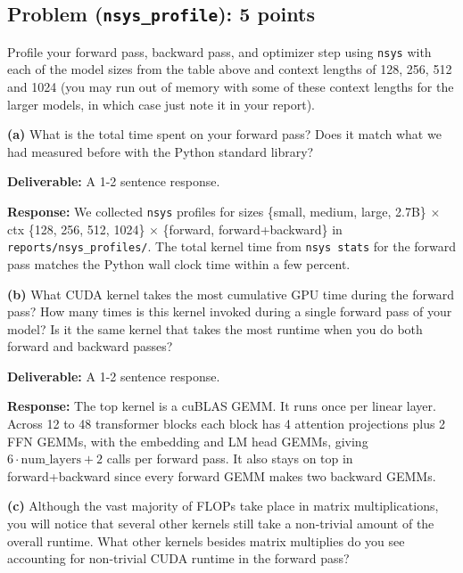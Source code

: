 \documentclass[11pt]{article}
\begin{document}
\subsection*{Problem (\texttt{nsys\_profile}): 5 points}

Profile your forward pass, backward pass, and optimizer step using \texttt{nsys} with each of the model sizes from the table above and context lengths of 128, 256, 512 and 1024 (you may run out of memory with some of these context lengths for the larger models, in which case just note it in your report).

\textbf{(a)} What is the total time spent on your forward pass? Does it match what we had measured before with the Python standard library?

\textbf{Deliverable:} A 1-2 sentence response.

\vspace{0.25cm}
\textbf{Response:}
We collected \texttt{nsys} profiles for sizes \{small, medium, large, 2.7B\} $\times$ ctx \{128, 256, 512, 1024\} $\times$ \{forward, forward+backward\} in \verb|reports/nsys_profiles/|. The total kernel time from \texttt{nsys stats} for the forward pass matches the Python wall clock time within a few percent.

\vspace{0.25cm}
\textbf{(b)} What CUDA kernel takes the most cumulative GPU time during the forward pass? How many times is this kernel invoked during a single forward pass of your model? Is it the same kernel that takes the most runtime when you do both forward and backward passes?

\textbf{Deliverable:} A 1-2 sentence response.

\vspace{0.25cm}
\textbf{Response:}
The top kernel is a cuBLAS GEMM. It runs once per linear layer. Across 12 to 48 transformer blocks each block has 4 attention projections plus 2 FFN GEMMs, with the embedding and LM head GEMMs, giving $6 \cdot \text{num\_layers} + 2$ calls per forward pass. It also stays on top in forward+backward since every forward GEMM makes two backward GEMMs.

\vspace{0.25cm}
\textbf{(c)} Although the vast majority of FLOPs take place in matrix multiplications, you will notice that several other kernels still take a non-trivial amount of the overall runtime. What other kernels besides matrix multiplies do you see accounting for non-trivial CUDA runtime in the forward pass?
\end{document}
